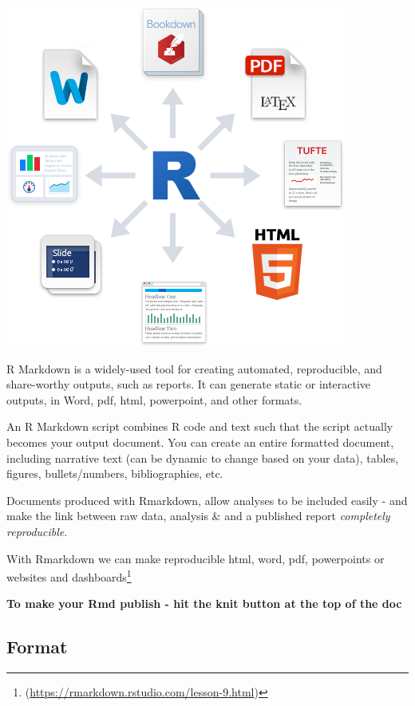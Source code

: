\documentclass[
]{book}
\begin{document}
\includegraphics[width=1\linewidth]{images/rmarkdownoutputformats}

R Markdown is a widely-used tool for creating automated, reproducible, and share-worthy outputs, such as reports. It can generate static or interactive outputs, in Word, pdf, html, powerpoint, and other formats.

An R Markdown script combines R code and text such that the script actually becomes your output document. You can create an entire formatted document, including narrative text (can be dynamic to change based on your data), tables, figures, bullets/numbers, bibliographies, etc.

Documents produced with Rmarkdown, allow analyses to be included easily - and make the link between raw data, analysis \& and a published report \emph{completely reproducible}.

With Rmarkdown we can make reproducible html, word, pdf, powerpoints or websites and dashboards\footnote{(\url{https://rmarkdown.rstudio.com/lesson-9.html})}

\textbf{To make your Rmd publish - hit the knit button at the top of the doc}

\hypertarget{format}{%
\subsection{Format}\label{format}}
\end{document}
